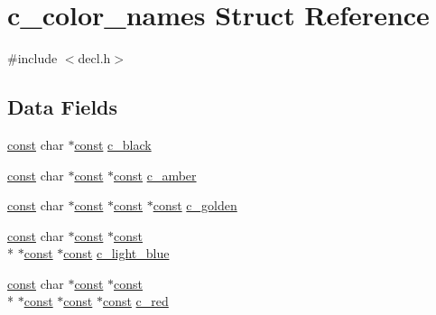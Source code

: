 \hypertarget{structc__color__names}{\section{c\+\_\+color\+\_\+names Struct Reference}
\label{structc__color__names}
}


{\ttfamily \#include $<$decl.\+h$>$}

\subsection*{Data Fields}
\begin{DoxyCompactItemize}
\item 
\hyperlink{tradstdc_8h_a2c212835823e3c54a8ab6d95c652660e}{const} char $\ast$\hyperlink{tradstdc_8h_a2c212835823e3c54a8ab6d95c652660e}{const} \hyperlink{structc__color__names_a06bef1382499ad35202ba6ae01f0a2ce}{c\+\_\+black}
\item 
\hyperlink{tradstdc_8h_a2c212835823e3c54a8ab6d95c652660e}{const} char $\ast$\hyperlink{tradstdc_8h_a2c212835823e3c54a8ab6d95c652660e}{const} $\ast$\hyperlink{tradstdc_8h_a2c212835823e3c54a8ab6d95c652660e}{const} \hyperlink{structc__color__names_a91cd94932db4b81e1dfd86f3babc6667}{c\+\_\+amber}
\item 
\hyperlink{tradstdc_8h_a2c212835823e3c54a8ab6d95c652660e}{const} char $\ast$\hyperlink{tradstdc_8h_a2c212835823e3c54a8ab6d95c652660e}{const} $\ast$\hyperlink{tradstdc_8h_a2c212835823e3c54a8ab6d95c652660e}{const} $\ast$\hyperlink{tradstdc_8h_a2c212835823e3c54a8ab6d95c652660e}{const} \hyperlink{structc__color__names_a31cb522727609277dbdf785da0013b22}{c\+\_\+golden}
\item 
\hyperlink{tradstdc_8h_a2c212835823e3c54a8ab6d95c652660e}{const} char $\ast$\hyperlink{tradstdc_8h_a2c212835823e3c54a8ab6d95c652660e}{const} $\ast$\hyperlink{tradstdc_8h_a2c212835823e3c54a8ab6d95c652660e}{const} \\*
$\ast$\hyperlink{tradstdc_8h_a2c212835823e3c54a8ab6d95c652660e}{const} $\ast$\hyperlink{tradstdc_8h_a2c212835823e3c54a8ab6d95c652660e}{const} \hyperlink{structc__color__names_a8bb4aae535671760cd53d454b8f1b91e}{c\+\_\+light\+\_\+blue}
\item 
\hyperlink{tradstdc_8h_a2c212835823e3c54a8ab6d95c652660e}{const} char $\ast$\hyperlink{tradstdc_8h_a2c212835823e3c54a8ab6d95c652660e}{const} $\ast$\hyperlink{tradstdc_8h_a2c212835823e3c54a8ab6d95c652660e}{const} \\*
$\ast$\hyperlink{tradstdc_8h_a2c212835823e3c54a8ab6d95c652660e}{const} $\ast$\hyperlink{tradstdc_8h_a2c212835823e3c54a8ab6d95c652660e}{const} $\ast$\hyperlink{tradstdc_8h_a2c212835823e3c54a8ab6d95c652660e}{const} \hyperlink{structc__color__names_a45e68ca7dc7d0955d16735ccb49fbdff}{c\+\_\+red}

\end{DoxyCompactItemize}
